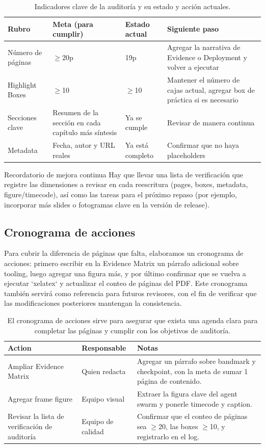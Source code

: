 \documentclass[a4paper]{article}
\begin{document}
\begin{table}[H]
\footnotesize
\centering
\begin{tabular}{p{3cm}p{3cm}p{3cm}p{3cm}}
\toprule
Rubro & Meta (para cumplir) & Estado actual & Siguiente paso \\
\midrule
Número de páginas & $\geq$20p & 19p & Agregar la narrativa de Evidence o Deployment y volver a ejecutar \\
Highlight Boxes & $\geq$10 & $\geq$10 & Mantener el número de cajas actual, agregar box de práctica si es necesario \\
Secciones clave & Resumen de la sección en cada capítulo más síntesis & Ya se cumple & Revisar de manera continua \\
Metadata & Fecha, autor y URL reales & Ya está completo & Confirmar que no haya placeholders \\
\bottomrule
\end{tabular}
\caption{Indicadores clave de la auditoría y su estado y acción actuales.}
\end{table}

\begin{importantbox}{Recordatorio de mejora continua}
Hay que llevar una lista de verificación que registre las dimensiones a revisar en cada reescritura (pages, boxes, metadata, figure/timecode), así como las tareas para el próximo repaso (por ejemplo, incorporar más slides o fotogramas clave en la versión de release).
\end{importantbox}

\subsection{Cronograma de acciones}
Para cubrir la diferencia de páginas que falta, elaboramos un cronograma de acciones: primero escribir en la Evidence Matrix un párrafo adicional sobre tooling, luego agregar una figura más, y por último confirmar que se vuelva a ejecutar `xelatex` y actualizar el conteo de páginas del PDF. Este cronograma también servirá como referencia para futuros revisores, con el fin de verificar que las modificaciones posteriores mantengan la consistencia.

\begin{table}[H]
\footnotesize
\centering
\begin{tabular}{p{3cm}p{4cm}p{5cm}}
\toprule
Action & Responsable & Notas \\
\midrule
Ampliar Evidence Matrix & Quien redacta & Agregar un párrafo sobre bandmark y checkpoint, con la meta de sumar 1 página de contenido. \\
Agregar frame figure & Equipo visual & Extraer la figura clave del agent swarm y ponerle timecode y caption. \\
Revisar la lista de verificación de auditoría & Equipo de calidad & Confirmar que el conteo de páginas sea $\geq$20, las boxes $\geq$10, y registrarlo en el log. \\
\bottomrule
\end{tabular}
\caption{El cronograma de acciones sirve para asegurar que exista una agenda clara para completar las páginas y cumplir con los objetivos de auditoría.}
\end{table}
\end{document}
